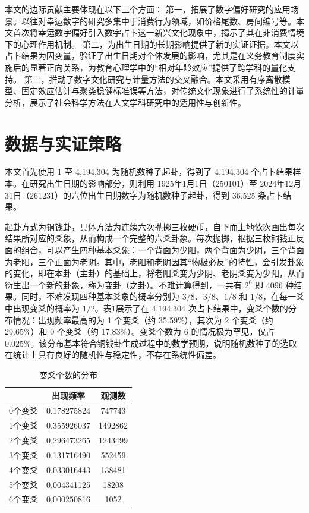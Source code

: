 \documentclass[11pt, a4paper, UTF8]{chinese-erj}
\begin{document}
本文的边际贡献主要体现在以下三个方面：
第一，拓展了数字偏好研究的应用场景。以往对幸运数字的研究多集中于消费行为领域，如价格尾数、房间编号等。本文首次将幸运数字偏好引入数字占卜这一新兴文化现象中，揭示了其在非消费情境下的心理作用机制。
第二，为出生日期的长期影响提供了新的实证证据。本文以占卜结果为因变量，验证了出生日期对个体发展的影响，尤其是在义务教育制度实施后的显著正向关系，为教育心理学中的“相对年龄效应”提供了跨学科的量化支持。
第三，推动了数字文化研究与计量方法的交叉融合。本文采用有序离散模型、固定效应估计与聚类稳健标准误等方法，对传统文化现象进行了系统性的计量分析，展示了社会科学方法在人文学科研究中的适用性与创新性。

\section{数据与实证策略}

本文首先使用 1 至 4,194,304 为随机数种子起卦，得到了 4,194,304 个占卜结果样本。在研究出生日期的影响部分，则利用 1925年1月1日（250101）至 2024年12月31日（261231）的六位出生日期数字为随机数种子起卦，得到 36,525 条占卜结果。

起卦方式为铜钱卦，具体方法为连续六次抛掷三枚硬币，自下而上地依次画出每次结果所对应的爻象，从而构成一个完整的六爻卦象。每次抛掷，根据三枚铜钱正反面的组合，可以产生四种基本爻象：一个背面为少阳，两个背面为少阴，三个背面为老阳，三个正面为老阴。其中，老阳和老阴因其“物极必反”的特性，会引发卦象的变化，即在本卦（主卦）的基础上，将老阳爻变为少阴、老阴爻变为少阳，从而衍生出一个新的卦象，称为变卦（之卦）。不难计算得到，一共有 $2^6$ 即 4096 种结果。同时，不难发现四种基本爻象的概率分别为 $3/8$、$3/8$、$1/8$ 和 $1/8$，在每一爻中出现变爻的概率为 $1/2$。表1展示了在 4,194,304 次占卜结果中，变爻个数的分布情况：出现频率最高的为 1 个变爻（约 35.59\%），其次为 2 个变爻（约 29.65\%）和 0 个变爻（约 17.83\%）。变爻个数为 6 的情况极为罕见，仅占 0.025\%。该分布基本符合铜钱卦生成过程中的数学预期，说明随机数种子的选取在统计上具有良好的随机性与稳定性，不存在系统性偏差。

\begin{table}[]
\centering
\caption{变爻个数的分布}
\begin{tabular}{lcc}
\toprule
 & 出现频率 & 观测数 \\
\midrule
0个变爻 & 0.178275824 & 747743 \\
1个变爻 & 0.355926037 & 1492862 \\
2个变爻 & 0.296473265 & 1243499 \\
3个变爻 & 0.131716490 & 552459 \\
4个变爻 & 0.033016443 & 138481 \\
5个变爻 & 0.004341125 & 18208 \\
6个变爻 & 0.000250816 & 1052 \\
\bottomrule
\end{tabular}
\end{table}
\end{document}
